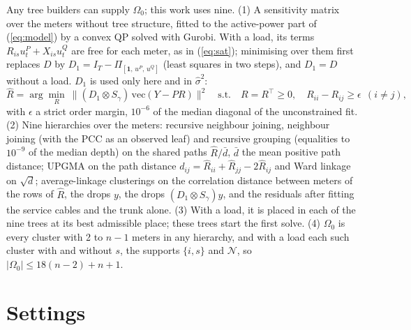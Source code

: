 \documentclass[journal,onecolumn,11pt]{IEEEtran}
\newcommand{\tp}{^{\top}}
\newcommand{\one}{\mathbf{1}}
\newcommand{\Nset}{\mathcal{N}}
\begin{document}
Any tree builders can supply $\Omega_0$; this work uses nine. (1) A sensitivity matrix over the meters without tree structure, fitted to the
active-power part of (\ref{eq:model}) by a convex QP solved with Gurobi. With a load, its terms $R_{is}u^P_t+X_{is}u^Q_t$ are
free for each meter, as in (\ref{eq:sat}); minimising over them first replaces $D$ by $D_1=I_T-\Pi_{[\one,\,u^P,\,u^Q]}$
(least squares in two steps), and $D_1=D$ without a load. $D_1$ is used only here and in $\hat\sigma^2$:
\begin{equation}\label{eq:rhat}
\hat R=\arg\min_R\ \big\|(D_1\otimes S_\gamma)\,\mathrm{vec}(Y-PR)\big\|^2\quad\text{s.t.}\quad R=R\tp\ge0,\quad
R_{ii}-R_{ij}\ge\epsilon\ \ (i\ne j),
\end{equation}
with $\epsilon$ a strict order margin, $10^{-6}$ of the median diagonal of the unconstrained fit.
(2) Nine hierarchies over the meters: recursive neighbour joining, neighbour joining (with the PCC as an observed leaf) and
recursive grouping (equalities to $10^{-9}$ of the median depth) on the shared paths $\hat R/\bar d$, $\bar d$ the mean
positive path distance;
UPGMA on the path distance $d_{ij}=\hat R_{ii}+\hat R_{jj}-2\hat R_{ij}$ and Ward linkage on $\sqrt d$; average-linkage
clusterings on the correlation distance between meters of the rows of $\hat R$, the drops $y$, the drops
$(D_1\otimes S_\gamma)y$, and the residuals after fitting the service cables and the trunk alone. (3) With a load, it is placed in each of
the nine trees at its best admissible place; these trees start the first solve. (4) $\Omega_0$ is every cluster with 2 to
$n-1$ meters in any hierarchy, and with a load each such cluster with and without $s$, the supports $\{i,s\}$ and $\Nset$,
so $|\Omega_0|\le18(n-2)+n+1$.

\section{Settings}
\end{document}
